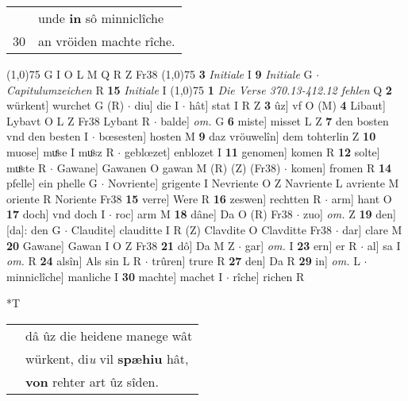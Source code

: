 \documentclass[8pt,a4paper,notitlepage]{article}
\begin{document}
\begin{table}[ht]
\begin{minipage}[t]{0.5\linewidth}
\begin{tabular}{rl}
 & unde \textbf{in} sô minniclîche\\ 
30 & an vröiden machte rîche.\\ 
\end{tabular}
\scriptsize
\line(1,0){75} \newline
G I O L M Q R Z Fr38 \newline
\line(1,0){75} \newline
\textbf{3} \textit{Initiale} I  \textbf{9} \textit{Initiale} G   $\cdot$ \textit{Capitulumzeichen} R  \textbf{15} \textit{Initiale} I  \newline
\line(1,0){75} \newline
\textbf{1} \textit{Die Verse 370.13-412.12 fehlen} Q  \textbf{2} würkent] wurchet G (R)  $\cdot$ diu] die I  $\cdot$ hât] stat I R Z \textbf{3} ûz] vf O (M) \textbf{4} Libaut] Lybavt O L Z Fr38 Lybant R  $\cdot$ balde] \textit{om.} G \textbf{6} miste] misset L Z \textbf{7} den bosten vnd den besten I  $\cdot$ bœsesten] hosten M \textbf{9} daz vröuwelîn] dem tohterlin Z \textbf{10} muose] muͤse I muͦsz R  $\cdot$ geblœzet] enblozet I \textbf{11} genomen] komen R \textbf{12} solte] muͦste R  $\cdot$ Gawane] Gawanen O gawan M (R) (Z) (Fr38)  $\cdot$ komen] fromen R \textbf{14} pfelle] ein phelle G  $\cdot$ Novriente] grigente I Nevriente O Z Navriente L avriente M oriente R Noriente Fr38 \textbf{15} verre] Were R \textbf{16} zeswen] rechtten R  $\cdot$ arm] hant O \textbf{17} doch] vnd doch I  $\cdot$ roc] arm M \textbf{18} dâne] Da O (R) Fr38  $\cdot$ zuo] \textit{om.} Z \textbf{19} den] [da]: den G  $\cdot$ Claudite] clauditte I R (Z) Clavdite O Clavditte Fr38  $\cdot$ dar] clare M \textbf{20} Gawane] Gawan I O Z Fr38 \textbf{21} dô] Da M Z  $\cdot$ gar] \textit{om.} I \textbf{23} ern] er R  $\cdot$ al] sa I \textit{om.} R \textbf{24} alsîn] Als sin L R  $\cdot$ trûren] trure R \textbf{27} den] Da R \textbf{29} in] \textit{om.} L  $\cdot$ minniclîche] manliche I \textbf{30} machte] machet I  $\cdot$ rîche] richen R \newline
\end{minipage}
\hspace{0.5cm}
\begin{minipage}[t]{0.5\linewidth}
\small
\begin{center}*T
\end{center}
\begin{tabular}{rl}
 & dâ ûz die heidene manege wât\\ 
 & würkent, di\textit{u} vil \textbf{spæhiu} hât,\\ 
 & \textbf{von} rehter art ûz sîden.\\ 

\end{tabular}
\end{minipage}
\end{table}
\end{document}
